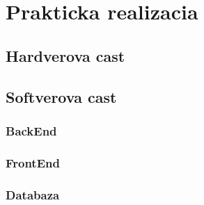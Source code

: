 \section{Prakticka realizacia}
\subsection{Hardverova cast}
\subsection{Softverova cast}
\subsubsection{BackEnd}
\subsubsection{FrontEnd}
\subsubsection{Databaza}
